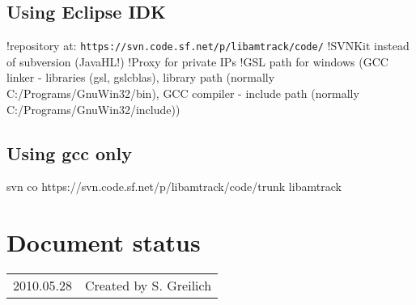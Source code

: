 \subsection{Using Eclipse IDK}
!repository at: \texttt{https://svn.code.sf.net/p/libamtrack/code/}
!SVNKit instead of subversion (JavaHL!)
!Proxy for private IPs
!GSL path for windows (GCC linker - libraries (gsl, gslcblas), library path (normally C:/Programs/GnuWin32/bin), GCC compiler - include path (normally C:/Programs/GnuWin32/include))
\subsection{Using gcc only}
svn co https://svn.code.sf.net/p/libamtrack/code/trunk libamtrack


\section*{Document status}
\begin{tabular}{l l}
2010.05.28&Created by S. Greilich
\end{tabular}